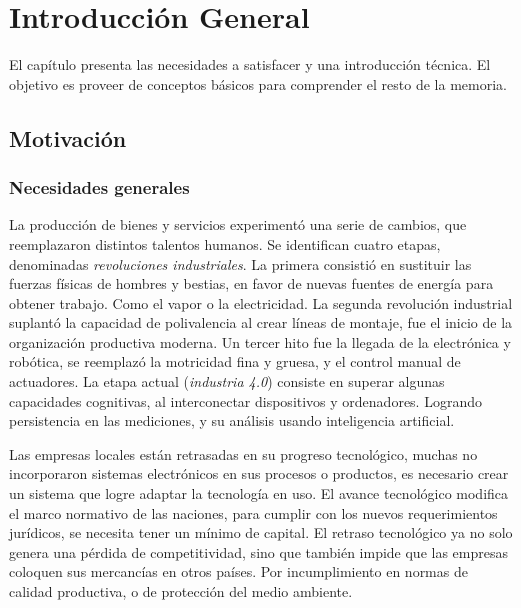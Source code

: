 \chapter{Introducción General}

\label{Chapter1} %
\label{IntroGeneral}


\newcommand{\keyword}[1]{\textbf{#1}}
\newcommand{\tabhead}[1]{\textbf{#1}}
\newcommand{\code}[1]{\texttt{#1}}
\newcommand{\file}[1]{\texttt{\bfseries#1}}
\newcommand{\option}[1]{\texttt{\itshape#1}}
\newcommand{\grados}{$^{\circ}$}


El capítulo presenta las necesidades a satisfacer y una introducción técnica. El objetivo es proveer de conceptos básicos para comprender el resto de la memoria.

\section{Motivación}
\label{motivacion}

	\subsection{Necesidades generales}
	
		La producción de bienes y servicios experimentó una serie de cambios, que reemplazaron distintos talentos humanos. Se identifican cuatro etapas, denominadas \emph{revoluciones industriales}. La primera consistió en sustituir las fuerzas físicas de hombres y bestias, en favor de nuevas fuentes de energía para obtener trabajo. Como el vapor o la electricidad. La segunda revolución industrial suplantó la capacidad de polivalencia al crear líneas de montaje, fue el inicio de la organización productiva moderna. Un tercer hito fue la llegada de la electrónica y robótica, se reemplazó la motricidad fina y gruesa, y el control manual de actuadores. La etapa actual (\emph{industria 4.0}) consiste en superar algunas capacidades cognitivas, al interconectar dispositivos y ordenadores. Logrando persistencia en las mediciones, y su análisis usando inteligencia artificial.

		Las empresas locales están retrasadas en su progreso tecnológico, muchas no incorporaron sistemas electrónicos en sus procesos o productos, es necesario crear un sistema que logre adaptar la tecnología en uso. El avance tecnológico modifica el marco normativo de las naciones, para cumplir con los nuevos requerimientos jurídicos, se necesita tener un mínimo de capital. El retraso tecnológico ya no solo genera una pérdida de competitividad, sino que también impide que las empresas coloquen sus mercancías en otros países. Por incumplimiento en normas de calidad productiva, o de protección del medio ambiente.

